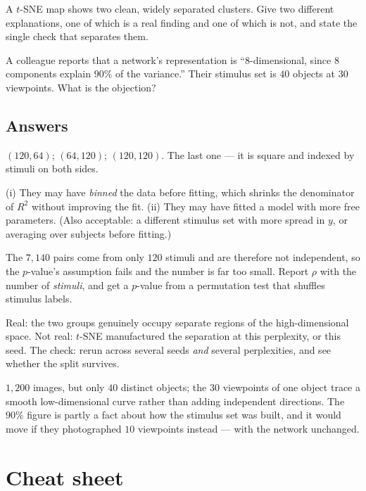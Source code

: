 \documentclass[11pt]{article}
\begin{document}
 A $t$-SNE map shows two clean, widely separated clusters. Give two
different explanations, one of which is a real finding and one of which is not,
and state the single check that separates them.

 A colleague reports that a network's representation is
``$8$-dimensional, since $8$ components explain $90\%$ of the variance.'' Their
stimulus set is $40$ objects at $30$ viewpoints. What is the objection?

\subsection*{Answers}

 $(120, 64)$; $(64, 120)$; $(120, 120)$. The last one --- it is square
and indexed by stimuli on both sides.

 (i) They may have \emph{binned} the data before fitting, which shrinks
the denominator of $R^2$ without improving the fit. (ii) They may have fitted a
model with more free parameters. (Also acceptable: a different stimulus set with
more spread in $y$, or averaging over subjects before fitting.)

 The $7{,}140$ pairs come from only $120$ stimuli and are therefore not
independent, so the $p$-value's assumption fails and the number is far too
small. Report $\rho$ with the number of \emph{stimuli}, and get a $p$-value from
a permutation test that shuffles stimulus labels.

 Real: the two groups genuinely occupy separate regions of the
high-dimensional space. Not real: $t$-SNE manufactured the separation at this
perplexity, or this seed. The check: rerun across several seeds \emph{and}
several perplexities, and see whether the split survives.

 $1{,}200$ images, but only $40$ distinct objects; the $30$ viewpoints of
one object trace a smooth low-dimensional curve rather than adding independent
directions. The $90\%$ figure is partly a fact about how the stimulus set was
built, and it would move if they photographed $10$ viewpoints instead --- with
the network unchanged.

\section*{Cheat sheet}
\end{document}
